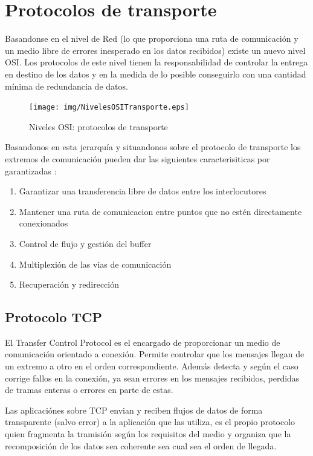 \documentclass[a4paper,spanish,12pt]{book}
\begin{document}
\section{Protocolos de transporte}

Basandonse en el nivel de Red (lo que proporciona una ruta de comunicación y un medio libre de errores inesperado en los datos recibidos) existe un nuevo nivel OSI. Los protocolos de este nivel tienen la responsabilidad de controlar la entrega en destino de los datos y en la medida de lo posible conseguirlo con una cantidad mínima de redundancia de datos.

\begin{figure}
	\texttt{[image: img/NivelesOSITransporte.eps]}	
              \caption{Niveles OSI: protocolos de transporte}
  \label{fig:nivelesOSITransporte}
\end{figure}

Basandonos en esta jerarquía y situandonos sobre el protocolo de transporte los extremos de comunicación pueden dar las siguientes caracterisiticas por garantizadas :
\begin{enumerate}
	\item{Garantizar una transferencia libre de datos entre los interlocutores}
	\item{Mantener una ruta de comunicacion entre puntos que no est\'en directamente conexionados}
	\item{Control de flujo y gestión del buffer}
	\item{Multiplexión de las vias de comunicación}
	\item{Recuperación y redirección}
\end{enumerate}
\subsection{Protocolo TCP}
El Transfer Control Protocol es el encargado de proporcionar un medio de comunicación orientado a conexión. Permite controlar que los mensajes llegan de un extremo a otro en el orden correspondiente. Además detecta y según el caso corrige fallos en la conexión, ya sean errores en los mensajes recibidos, perdidas de tramas enteras o errores en parte de estas.

Las aplicaciónes sobre TCP envian y reciben flujos de datos de forma transparente (salvo error) a la aplicación que las utiliza, es el propio protocolo quien fragmenta la tramisión según los requisitos del medio y organiza que la recomposición de los datos sea coherente sea cual sea el orden de llegada.
\end{document}
